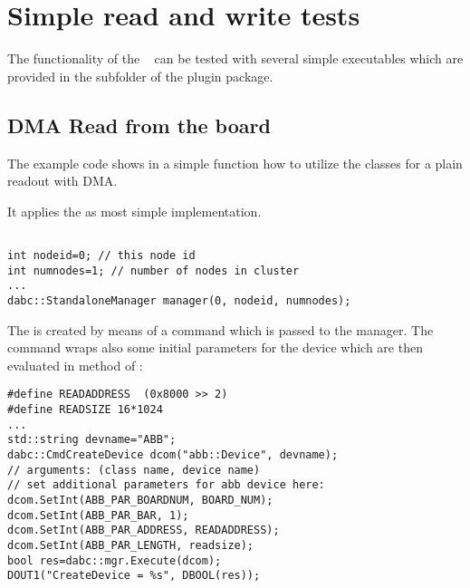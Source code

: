 \section{Simple read and write tests}
\label{prog_exapci_simpletest}
The functionality of the \ABB~ can be tested with several simple
executables which are provided in the  subfolder of the
 plugin package.

\subsection{DMA Read from the board}
\label{prog_exapci_simpletest_read}
The example code  shows in a
simple  function how to utilize the
 classes 
for a plain readout with DMA.
\begin{compactenum} 

\item It applies the  as most simple
 implementation.
\begin{small}
\begin{verbatim}

int nodeid=0; // this node id
int numnodes=1; // number of nodes in cluster
...
dabc::StandaloneManager manager(0, nodeid, numnodes);
\end{verbatim}
\end{small}

\item The  is created by means of a command
 which is passed to the manager. The 
command wraps also some initial
parameters for the device which are then evaluated in 
method  of :

\begin{small}
\begin{verbatim}
#define READADDRESS  (0x8000 >> 2)
#define READSIZE 16*1024
...
std::string devname="ABB";
dabc::CmdCreateDevice dcom("abb::Device", devname);
// arguments: (class name, device name)
// set additional parameters for abb device here:
dcom.SetInt(ABB_PAR_BOARDNUM, BOARD_NUM);
dcom.SetInt(ABB_PAR_BAR, 1);
dcom.SetInt(ABB_PAR_ADDRESS, READADDRESS);
dcom.SetInt(ABB_PAR_LENGTH, readsize);
bool res=dabc::mgr.Execute(dcom);
DOUT1("CreateDevice = %s", DBOOL(res));
\end{verbatim}
\end{small}


\end{compactenum}
